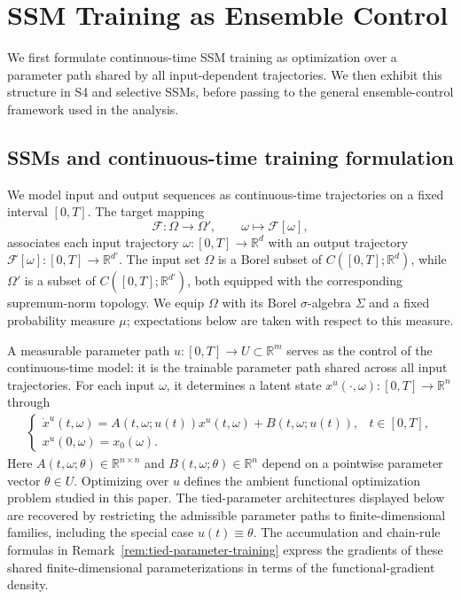 \documentclass[11pt]{amsart}
\numberwithin{equation}{section} %
\theoremstyle{remark}
\begin{document}
\section{SSM Training as Ensemble Control} \label{sec:form}

We first formulate continuous-time SSM training as optimization over a parameter path shared by all input-dependent trajectories. We then exhibit this structure in S4 and selective SSMs, before passing to the general ensemble-control framework used in the analysis.

\subsection{SSMs and continuous-time training formulation}\label{subsec:ssm_training_formulation}

We model input and output sequences as continuous-time trajectories on a fixed interval $[0,T]$. The target mapping
\[
    \mathcal F:\Omega\to\Omega',\qquad \omega\mapsto\mathcal F[\omega],
\]
associates each input trajectory $\omega:[0,T]\to\mathbb R^d$ with an output trajectory $\mathcal F[\omega]:[0,T]\to\mathbb R^{d'}$. 
The input set $\Omega$ is a Borel subset of $C([0,T];\mathbb R^d)$, while $\Omega'$ is a subset of $C([0,T];\mathbb R^{d'})$, both equipped with the corresponding supremum-norm topology.
We equip $\Omega$ with its Borel $\sigma$-algebra $\Sigma$ and a fixed probability measure $\mu$; expectations below are taken with respect to this measure.



A measurable parameter path $u:[0,T]\to U\subset\mathbb R^m$ serves as the control of the continuous-time model: it is the trainable parameter path shared across all input trajectories. For each input $\omega$, it determines a latent state $x^u(\cdot,\omega):[0,T]\to\mathbb R^n$ through
\begin{align}\label{eq:ssm_dyn}
    \begin{cases}
        \dot x^u(t,\omega)
        =A(t,\omega;u(t))x^u(t,\omega)+B(t,\omega;u(t)),
        &t\in[0,T],\\[4pt]
        x^u(0,\omega)=x_0(\omega).
    \end{cases}
\end{align}
Here $A(t,\omega;\theta)\in\mathbb R^{n\times n}$ and $B(t,\omega;\theta)\in\mathbb R^n$ depend on a pointwise parameter vector $\theta\in U$.  
Optimizing over \(u\) defines the ambient functional optimization problem studied in this paper. The tied-parameter architectures displayed below are recovered by restricting the admissible parameter paths to finite-dimensional families, including the special case \(u(t)\equiv\theta\). The accumulation and chain-rule formulas in Remark~\ref{rem:tied-parameter-training} express the gradients of these shared finite-dimensional parameterizations in terms of the functional-gradient density.
\end{document}
